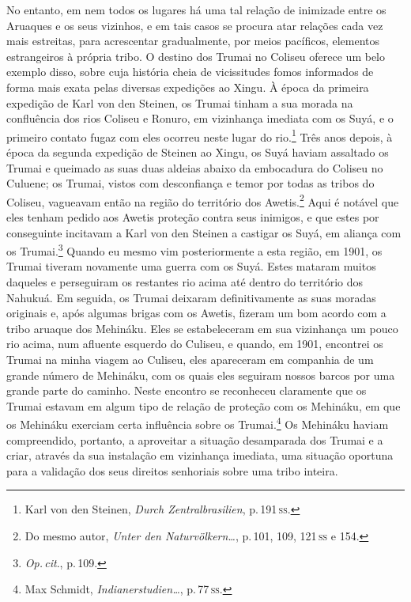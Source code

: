 No entanto, em nem todos os lugares há uma tal relação de inimizade
entre os Aruaques e os seus vizinhos, e em tais casos se procura atar
relações cada vez mais estreitas, para acrescentar gradualmente, por
meios pacíficos, elementos estrangeiros à própria tribo. O destino dos
Trumai no Coliseu oferece um belo exemplo disso, sobre cuja história
cheia de vicissitudes fomos informados de forma mais exata pelas
diversas expedições ao Xingu. À época da primeira expedição de Karl von
den Steinen, os Trumai tinham a sua morada na confluência dos rios
Coliseu e Ronuro, em vizinhança imediata com os Suyá, e o primeiro
contato fugaz com eles ocorreu neste lugar do rio.\footnote{Karl von den
  Steinen, \textit{Durch Zentralbrasilien}, p.\,191\,\textsc{ss}.} Três anos depois,
à época da segunda expedição de Steinen ao Xingu, os Suyá haviam
assaltado os Trumai e queimado as suas duas aldeias abaixo da embocadura
do Coliseu no Culuene; os Trumai, vistos com desconfiança e temor por
todas as tribos do Coliseu, vagueavam então na região do território dos
Awetis.\footnote{Do mesmo autor, \textit{Unter den Naturvölkern\ldots}, p.\,101, 109, 121\,\textsc{ss} e 154.} Aqui é notável que
eles tenham pedido aos Awetis proteção contra seus inimigos, e que estes
por conseguinte incitavam a Karl von den Steinen a castigar os Suyá, em
aliança com os Trumai.\footnote{\textit{Op.\,cit}., p.\,109.} Quando eu mesmo vim
posteriormente a esta região, em 1901, os Trumai tiveram novamente uma
guerra com os Suyá. Estes mataram muitos daqueles e perseguiram os
restantes rio acima até dentro do território dos Nahukuá. Em seguida, os
Trumai deixaram definitivamente as suas moradas originais e, após
algumas brigas com os Awetis, fizeram um bom acordo com a tribo aruaque
dos Mehináku. Eles se estabeleceram em sua vizinhança um pouco rio
acima, num afluente esquerdo do Culiseu, e quando, em 1901, encontrei os
Trumai na minha viagem ao Culiseu, eles apareceram em companhia de um
grande número de Mehináku, com os quais eles seguiram nossos barcos por
uma grande parte do caminho. Neste encontro se reconheceu claramente
que os Trumai estavam em algum tipo de relação de proteção com os
Mehináku, em que os Mehináku exerciam certa influência sobre os
Trumai.\footnote{Max Schmidt, \textit{Indianerstudien\ldots},
  p.\,77\,\textsc{ss}.} Os Mehináku haviam compreendido, portanto, a aproveitar a
situação desamparada dos Trumai e a criar, através da sua instalação em
vizinhança imediata, uma situação oportuna para a validação dos seus
direitos senhoriais sobre uma tribo inteira.

